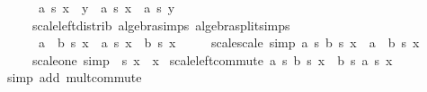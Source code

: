 \begin{isabellebody}
\ \ \ \ \ \ {\isachardoublequoteopen}a\ {\isacharasterisk}{\kern0pt}s\ {\isacharparenleft}{\kern0pt}x\ {\isacharplus}{\kern0pt}\ y{\isacharparenright}{\kern0pt}\ {\isacharequal}{\kern0pt}\ a\ {\isacharasterisk}{\kern0pt}s\ x\ {\isacharplus}{\kern0pt}\ a\ {\isacharasterisk}{\kern0pt}s\ y{\isachardoublequoteclose}\isanewline
\ \ \ \ \ scale{\isacharunderscore}{\kern0pt}left{\isacharunderscore}{\kern0pt}distrib\ {\isacharbrackleft}{\kern0pt}algebra{\isacharunderscore}{\kern0pt}simps{\isacharcomma}{\kern0pt}\ algebra{\isacharunderscore}{\kern0pt}split{\isacharunderscore}{\kern0pt}simps{\isacharbrackright}{\kern0pt}{\isacharcolon}{\kern0pt}\isanewline
\ \ \ \ \ \ {\isachardoublequoteopen}{\isacharparenleft}{\kern0pt}a\ {\isacharplus}{\kern0pt}\ b{\isacharparenright}{\kern0pt}\ {\isacharasterisk}{\kern0pt}s\ x\ {\isacharequal}{\kern0pt}\ a\ {\isacharasterisk}{\kern0pt}s\ x\ {\isacharplus}{\kern0pt}\ b\ {\isacharasterisk}{\kern0pt}s\ x{\isachardoublequoteclose}\isanewline
\ \ \ \ \ scale{\isacharunderscore}{\kern0pt}scale\ {\isacharbrackleft}{\kern0pt}simp{\isacharbrackright}{\kern0pt}{\isacharcolon}{\kern0pt}\ {\isachardoublequoteopen}a\ {\isacharasterisk}{\kern0pt}s\ {\isacharparenleft}{\kern0pt}b\ {\isacharasterisk}{\kern0pt}s\ x{\isacharparenright}{\kern0pt}\ {\isacharequal}{\kern0pt}\ {\isacharparenleft}{\kern0pt}a\ {\isacharasterisk}{\kern0pt}\ b{\isacharparenright}{\kern0pt}\ {\isacharasterisk}{\kern0pt}s\ x{\isachardoublequoteclose}\isanewline
\ \ \ \ \ scale{\isacharunderscore}{\kern0pt}one\ {\isacharbrackleft}{\kern0pt}simp{\isacharbrackright}{\kern0pt}{\isacharcolon}{\kern0pt}\ {\isachardoublequoteopen}{}\ {\isacharasterisk}{\kern0pt}s\ x\ {\isacharequal}{\kern0pt}\ x{\isachardoublequoteclose}\isanewline
{}\isanewline
\isanewline
{}\isamarkupfalse%
\ scale{\isacharunderscore}{\kern0pt}left{\isacharunderscore}{\kern0pt}commute{\isacharcolon}{\kern0pt}\ {\isachardoublequoteopen}a\ {\isacharasterisk}{\kern0pt}s\ {\isacharparenleft}{\kern0pt}b\ {\isacharasterisk}{\kern0pt}s\ x{\isacharparenright}{\kern0pt}\ {\isacharequal}{\kern0pt}\ b\ {\isacharasterisk}{\kern0pt}s\ {\isacharparenleft}{\kern0pt}a\ {\isacharasterisk}{\kern0pt}s\ x{\isacharparenright}{\kern0pt}{\isachardoublequoteclose}\isanewline
%
\isadelimproof
\ \ %
\endisadelimproof
%
\isatagproof
{}\isamarkupfalse%
\ {\isacharparenleft}{\kern0pt}simp\ add{\isacharcolon}{\kern0pt}\ mult{\isachardot}{\kern0pt}commute{\isacharparenright}{\kern0pt}%
\endisatagproof
{\isafoldproof}%
%
\isadelimproof
\isanewline

\end{isabellebody}
